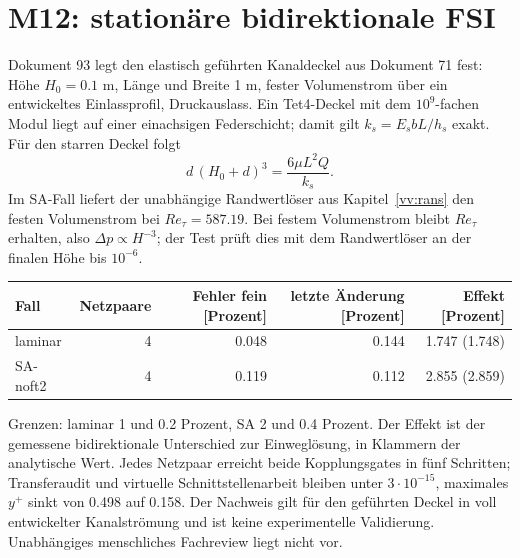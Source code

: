 \chapter{M12: stationäre bidirektionale FSI}\label{vv:fsi}
Dokument 93 legt den elastisch geführten Kanaldeckel aus Dokument 71 fest:
Höhe \(H_0=0.1\) m, Länge und Breite 1 m, fester Volumenstrom über ein
entwickeltes Einlassprofil, Druckauslass. Ein Tet4-Deckel mit dem
\(10^9\)-fachen Modul liegt auf einer einachsigen Federschicht; damit gilt
\(k_s=E_s bL/h_s\) exakt. Für den starren Deckel folgt
\[
d\,(H_0+d)^3=\frac{6\mu L^2 Q}{k_s}.
\]
Im SA-Fall liefert der unabhängige Randwertlöser aus Kapitel~\ref{vv:rans}
den festen Volumenstrom bei \(Re_\tau=587.19\). Bei festem Volumenstrom bleibt
\(Re_\tau\) erhalten, also \(\Delta p\propto H^{-3}\); der Test prüft dies mit
dem Randwertlöser an der finalen Höhe bis \(10^{-6}\).

\begin{center}
\begin{tabular}{lrrrr}
\toprule
Fall & Netzpaare & Fehler fein [Prozent] & letzte Änderung [Prozent] & Effekt [Prozent] \\
\midrule
laminar & 4 & 0.048 & 0.144 & 1.747 (1.748) \\
SA-noft2 & 4 & 0.119 & 0.112 & 2.855 (2.859) \\
\bottomrule
\end{tabular}
\end{center}
Grenzen: laminar 1 und 0.2 Prozent, SA 2 und 0.4 Prozent. Der Effekt ist der
gemessene bidirektionale Unterschied zur Einweglösung, in Klammern der
analytische Wert. Jedes Netzpaar erreicht beide Kopplungsgates in fünf
Schritten; Transferaudit und virtuelle Schnittstellenarbeit bleiben unter
\(3\cdot10^{-15}\), maximales \(y^+\) sinkt von 0.498 auf 0.158. Der Nachweis
gilt für den geführten Deckel in voll entwickelter Kanalströmung und ist keine
experimentelle Validierung. Unabhängiges menschliches Fachreview liegt nicht vor.
